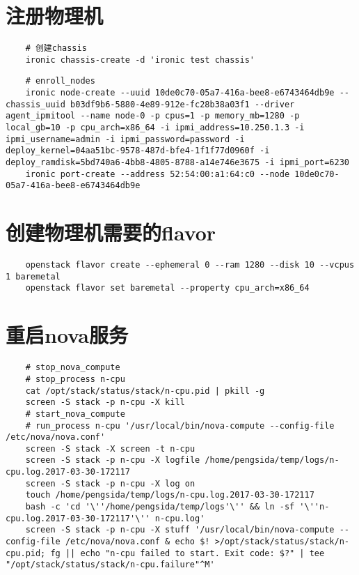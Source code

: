 \documentclass[a4paper,left=1.5cm,right=1.5cm,11pt]{article}
\begin{document}
\section{注册物理机}
	\begin{lstlisting}
	# 创建chassis
	ironic chassis-create -d 'ironic test chassis'
	\end{lstlisting}

	\begin{lstlisting}
	# enroll_nodes
	ironic node-create --uuid 10de0c70-05a7-416a-bee8-e6743464db9e --chassis_uuid b03df9b6-5880-4e89-912e-fc28b38a03f1 --driver agent_ipmitool --name node-0 -p cpus=1 -p memory_mb=1280 -p local_gb=10 -p cpu_arch=x86_64 -i ipmi_address=10.250.1.3 -i ipmi_username=admin -i ipmi_password=password -i deploy_kernel=04aa51bc-9578-487d-bfe4-1f1f77d0960f -i deploy_ramdisk=5bd740a6-4bb8-4805-8788-a14e746e3675 -i ipmi_port=6230
	ironic port-create --address 52:54:00:a1:64:c0 --node 10de0c70-05a7-416a-bee8-e6743464db9e
	\end{lstlisting}
	
\section{创建物理机需要的flavor}
	\begin{lstlisting}
	openstack flavor create --ephemeral 0 --ram 1280 --disk 10 --vcpus 1 baremetal
	openstack flavor set baremetal --property cpu_arch=x86_64	
	\end{lstlisting}

\section{重启nova服务}
	\begin{lstlisting}
	# stop_nova_compute
	# stop_process n-cpu
	cat /opt/stack/status/stack/n-cpu.pid | pkill -g
	screen -S stack -p n-cpu -X kill
	# start_nova_compute
	# run_process n-cpu '/usr/local/bin/nova-compute --config-file /etc/nova/nova.conf'
	screen -S stack -X screen -t n-cpu
	screen -S stack -p n-cpu -X logfile /home/pengsida/temp/logs/n-cpu.log.2017-03-30-172117
	screen -S stack -p n-cpu -X log on
	touch /home/pengsida/temp/logs/n-cpu.log.2017-03-30-172117
	bash -c 'cd '\''/home/pengsida/temp/logs'\'' && ln -sf '\''n-cpu.log.2017-03-30-172117'\'' n-cpu.log'
	screen -S stack -p n-cpu -X stuff '/usr/local/bin/nova-compute --config-file /etc/nova/nova.conf & echo $! >/opt/stack/status/stack/n-cpu.pid; fg || echo "n-cpu failed to start. Exit code: $?" | tee "/opt/stack/status/stack/n-cpu.failure"^M'	
	\end{lstlisting}
\end{document}
